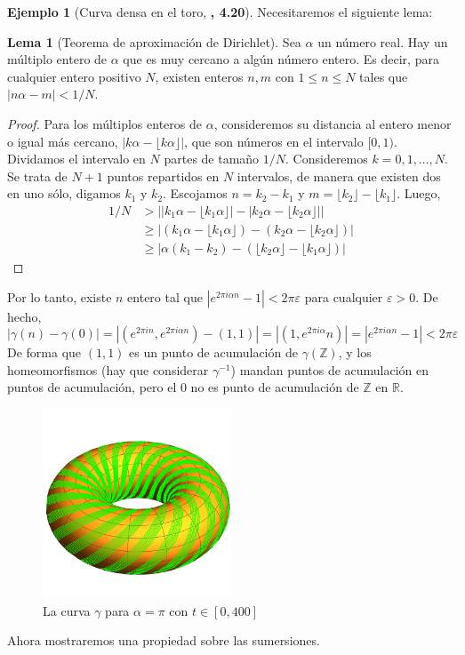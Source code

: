 \documentclass[spanish]{book}
\theoremstyle{definition}
\newtheorem*{lema}{Lema}
\newtheorem*{ejem}{Ejemplo}
\newcommand{\R}{\mathbb{R}}
\newcommand{\Z}{\mathbb{Z}}
\begin{document}
\begin{ejem}[Curva densa en el toro, \cite{Lee} \textbf{, 4.20}]
	Necesitaremos el siguiente lema:
	\begin{lema}[Teorema de aproximación de Dirichlet]
		Sea $\alpha$ un número real. Hay un múltiplo entero de $\alpha$ que es muy cercano a algún número entero. Es decir, para cualquier entero positivo $N$, existen enteros $n,m$ con $1\leq n\leq N$ tales que ${|n\alpha-m|<1/N}$.
	\end{lema}
	\begin{proof}
		Para los múltiplos enteros de $\alpha$, consideremos su distancia al entero menor o igual más cercano, $|k\alpha-\lfloor k\alpha\rfloor|$, que son números en el intervalo $[0,1)$. Dividamos el intervalo en $N$ partes de tamaño $1/N$. Consideremos $k=0,1,\ldots,N$. Se trata de $N+1$ puntos repartidos en $N$ intervalos, de manera que existen dos en uno sólo, digamos $k_1$ y $k_2$. Escojamos $n=k_2-k_1$ y $m=\lfloor k_2\rfloor-\lfloor k_1\rfloor$. Luego,
		\begin{align*}
			1/N&>\Big||k_1\alpha-\lfloor k_1\alpha\rfloor|-|k_2\alpha-\lfloor k_2\alpha\rfloor|\Big|\\
			&\geq|(k_1\alpha-\lfloor k_1\alpha\rfloor)-(k_2\alpha-\lfloor k_2\alpha\rfloor)|\\
			&\geq|\alpha(k_1-k_2)-(\lfloor k_2\alpha\rfloor-\lfloor k_1\alpha\rfloor)|
		\end{align*}
	\end{proof}
	Por lo tanto, existe $n$ entero tal que $|e^{2\pi i\alpha n}-1|<2\pi\varepsilon$ para cualquier $\varepsilon>0.$ De hecho,
	\[|\gamma(n)-\gamma(0)|=|(e^{2\pi in},e^{2\pi i\alpha n})-(1,1)|=|(1,e^{2\pi i\alpha} n)|=|e^{2\pi i\alpha n}-1|<2\pi\varepsilon\]
	De forma que $(1,1)$ es un punto de acumulación de $\gamma(\Z)$, y los homeomorfismos (hay que considerar $\gamma^{-1}$) mandan puntos de acumulación en puntos de acumulación, pero el 0 no es punto de acumulación de $\Z$ en $\R$.
	\begin{figure}[H]
		\centering
		\includegraphics[width=0.5\textwidth]{fig9}
		\caption*{La curva $\gamma$ para $\alpha=\pi$ con $t\in[0,400]$}
	\end{figure}
\end{ejem}
Ahora mostraremos una propiedad sobre las sumersiones.
\end{document}
